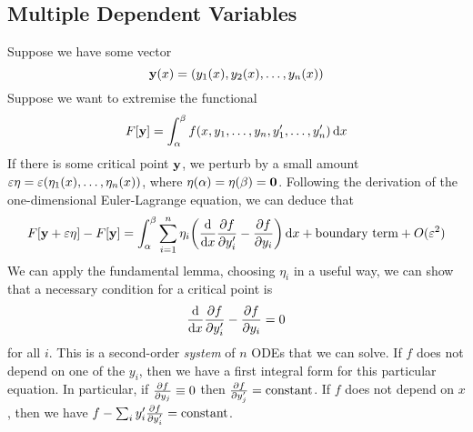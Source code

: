 \subsection{Multiple Dependent Variables}
Suppose we have some vector
\[ \vb y(x) = (y_1(x), y_2(x), \dots, y_n(x)) \]
Suppose we want to extremise the functional
\[ F[\vb y] = \int_\alpha^\beta f(x, y_1, \dots, y_n, y'_1, \dots, y'_n) \dd{x} \]
If there is some critical point \( \vb y \), we perturb by a small amount \( \varepsilon\vb \eta = \varepsilon(\eta_1(x), \dots, \eta_n(x)) \), where \( \vb\eta(\alpha) = \vb\eta(\beta) = \vb 0 \).
Following the derivation of the one-dimensional Euler-Lagrange equation, we can deduce that
\[ F[\vb y + \varepsilon \vb \eta] - F[\vb y] = \int_\alpha^\beta \sum_{i=1}^n \eta_i \qty(\dv{x}\pdv{f}{y_i'} - \pdv{f}{y_i})\dd{x} + \text{boundary term} + O(\varepsilon^2) \]
We can apply the fundamental lemma, choosing \( \eta_i \) in a useful way, we can show that a necessary condition for a critical point is
\[ \dv{x}\pdv{f}{y_i'} - \pdv{f}{y_i} = 0 \]
for all \( i \). This is a second-order \textit{system} of \( n \) ODEs that we can solve.
If \( f \) does not depend on one of the \( y_i \), then we have a first integral form for this particular equation. In particular, if \( \pdv{f}{y_j} \equiv 0 \) then \( \pdv{f}{y_j'} = \text{constant} \).
If \( f \) does not depend on \( x \), then we have \( f - \sum_i y_i' \pdv{f}{y_i'} = \text{constant} \).
